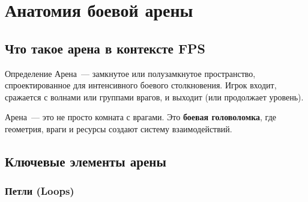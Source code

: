 \documentclass[a4paper,11pt]{report}
\begin{document}
\chapter{Анатомия боевой арены}

\section{Что такое арена в контексте FPS}

\begin{principle}{Определение}
Арена~--- замкнутое или полузамкнутое пространство, спроектированное
для интенсивного боевого столкновения. Игрок входит, сражается с
волнами или группами врагов, и выходит (или продолжает уровень).
\end{principle}

Арена~--- это не просто комната с врагами. Это \textbf{боевая головоломка},
где геометрия, враги и ресурсы создают систему взаимодействий.

\section{Ключевые элементы арены}

\subsection{Петли (Loops)}
\end{document}
